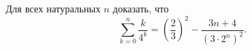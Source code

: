 Для всех натуральных $n$ доказать, что
$$
	\sum_{k=0}^n \frac{k}{4^k} = \left(\frac{2}{3}\right)^2 - \frac{3n+4}{(3\cdot 2^n)^2}
	.
$$
